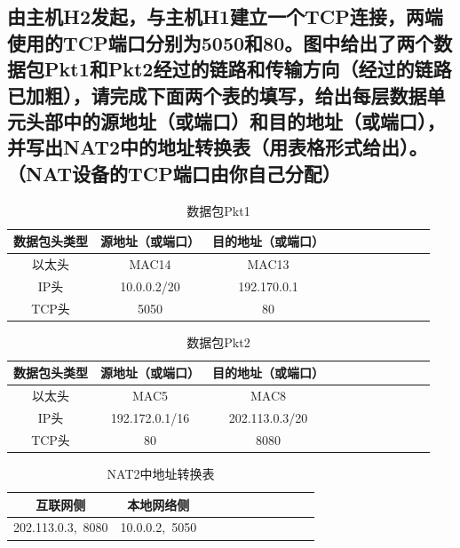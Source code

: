 \documentclass{article}
\begin{document}
\subsection{由主机H2发起，与主机H1建立一个TCP连接，两端使用的TCP端口分别为5050和80。图中给出了两个数据包Pkt1和Pkt2经过的链路和传输方向（经过的链路已加粗），请完成下面两个表的填写，给出每层数据单元头部中的源地址（或端口）和目的地址（或端口），并写出NAT2中的地址转换表（用表格形式给出）。（NAT设备的TCP端口由你自己分配）}
\begin{table}[!htbp]
  \centering
  \begin{tabular}{ccccccccccc}
  \toprule  
  数据包头类型&源地址（或端口）& 目的地址（或端口）\\
  \midrule
  以太头& MAC14& MAC13\\
  IP头& 10.0.0.2/20& 192.170.0.1\\
  TCP头& 5050& 80\\
  \bottomrule
  \end{tabular}
  \caption{数据包Pkt1}
\end{table}
\begin{table}[!htbp]
  \centering
  \begin{tabular}{ccccccccccc}
  \toprule  
  数据包头类型&源地址（或端口）& 目的地址（或端口）\\
  \midrule
  以太头& MAC5&MAC8 \\
  IP头& 192.172.0.1/16& 202.113.0.3/20\\
  TCP头&80 &  8080\\
  \bottomrule
  \end{tabular}
  \caption{数据包Pkt2}
\end{table}
\begin{table}[!htbp]
  \centering
  \begin{tabular}{ccccccccccc}
  \toprule  
  互联网侧&本地网络侧\\
  \midrule
  202.113.0.3,\ 8080 &10.0.0.2,\ 5050\\
  \bottomrule
  \end{tabular}
  \caption{NAT2中地址转换表}
\end{table}
\end{document}
